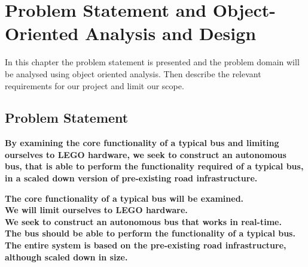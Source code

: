 \chapter{Problem Statement and Object-Oriented Analysis and Design}



In this chapter the problem statement is presented and the problem domain will be analysed using object oriented analysis. Then describe the relevant requirements for our project and limit our scope.

\section{Problem Statement} \label{problemStatement}

\textbf{By examining the core functionality of a typical bus and limiting ourselves to LEGO hardware, we seek to construct an autonomous bus, that is able to perform the functionality required of a typical bus, in a scaled down version of pre-existing road infrastructure.}


\textbf{
The core functionality of a typical bus will be examined.\\
We will limit ourselves to LEGO hardware.\\
We seek to construct an autonomous bus that works in real-time.\\
The bus should be able to perform the functionality of a typical bus.\\
The entire system is based on the pre-existing road infrastructure, although scaled down in size.}



